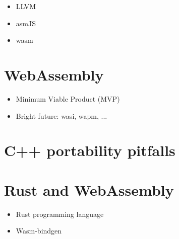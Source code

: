 \begin{itemize}
	\item LLVM
	\item asmJS
	\item wasm
\end{itemize}

\section{WebAssembly}%
\label{sec:WebAssembly}

\begin{itemize}
	\item Minimum Viable Product (MVP)
	\item Bright future: wasi, wapm, ...
\end{itemize}

\section{C++ portability pitfalls}%
\label{sec:cpp_pitfalls}

\section{Rust and WebAssembly}%
\label{sec:rust_wasm}

\begin{itemize}
	\item Rust programming language
	\item Wasm-bindgen
\end{itemize}
